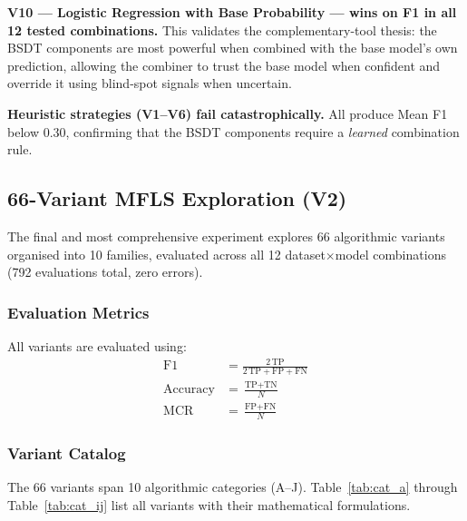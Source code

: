 \documentclass[journal]{IEEEtran}
\begin{document}
\textbf{V10 --- Logistic Regression with Base Probability --- wins on F1 in all 12 tested combinations.} This validates the complementary-tool thesis: the BSDT components are most powerful when combined with the base model's own prediction, allowing the combiner to trust the base model when confident and override it using blind-spot signals when uncertain.

\textbf{Heuristic strategies (V1--V6) fail catastrophically.} All produce Mean F1 below 0.30, confirming that the BSDT components require a \textit{learned} combination rule.

\subsection{66-Variant MFLS Exploration (V2)}
\label{ssec:v2}

The final and most comprehensive experiment explores 66 algorithmic variants organised into 10 families, evaluated across all 12 dataset$\times$model combinations (792 evaluations total, zero errors).

\subsubsection{Evaluation Metrics}

All variants are evaluated using:
\begin{align}
  \text{F1}     &= \frac{2\,\text{TP}}{2\,\text{TP} + \text{FP} + \text{FN}} \label{eq:f1} \\
  \text{Accuracy} &= \frac{\text{TP} + \text{TN}}{N} \label{eq:acc} \\
  \text{MCR}    &= \frac{\text{FP} + \text{FN}}{N} \label{eq:mcr}
\end{align}

\subsubsection{Variant Catalog}

The 66 variants span 10 algorithmic categories (A--J). Table~\ref{tab:cat_a} through Table~\ref{tab:cat_ij} list all variants with their mathematical formulations.
\end{document}
